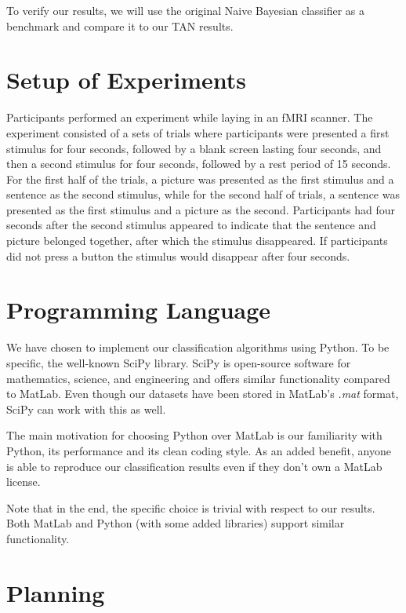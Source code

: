 \documentclass[a4paper, 11pt]{scrartcl}
\begin{document}
To verify our results, we will use the original Naive Bayesian classifier as a benchmark and compare it to our TAN results.

\section{Setup of Experiments}
\label{sec:setup}

Participants performed an experiment while laying in an fMRI scanner. The experiment consisted of a sets of trials where participants were presented a first stimulus for four seconds, followed by a blank screen lasting four seconds, and then a second stimulus for four seconds, followed by a rest period of 15 seconds. For the first half of the trials, a picture was presented as the first stimulus and a sentence as the second stimulus, while for the second half of trials, a sentence was presented as the first stimulus and a picture as the second. Participants had four seconds after the second stimulus appeared to indicate that the sentence and picture belonged together, after which the stimulus disappeared. If participants did not press a button the stimulus would disappear after four seconds.

\section{Programming Language}
\label{sec:language}

We have chosen to implement our classification algorithms using Python. To be specific,  the well-known SciPy library. SciPy is open-source software for mathematics, science, and engineering and offers similar functionality compared to MatLab. Even though our datasets have been stored in MatLab's \textit{.mat} format, SciPy can work with this as well.

The main motivation for choosing Python over MatLab is our familiarity with Python, its performance and its clean coding style. As an added benefit, anyone is able to reproduce our classification results even if they don't own a MatLab license.

Note that in the end, the specific choice is trivial with respect to our results. Both MatLab and Python (with some added libraries) support similar functionality.

\section{Planning}
\end{document}
